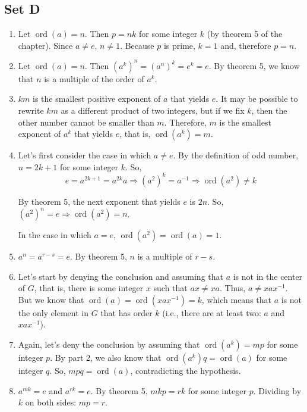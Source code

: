 \documentclass{article}
\DeclareMathOperator{\ord}{ord}
\begin{document}
\subsection{Set D}
\begin{enumerate}
    \item Let $ \ord(a) = n $. Then $ p = nk $ for some integer $ k $ (by theorem 5 of the chapter). Since $ a \ne e $, $ n \ne  1$. Because $ p $ is prime, $  k = 1 $ and, therefore $ p = n $.

    \item Let $ \ord(a) = n $. Then $ (a^k)^n = (a^n)^k = e^k = e $. By theorem 5, we know that $ n $ is a multiple of the order of $ a^k $.

    \item $ km $ is the smallest positive exponent of $ a $ that yields $ e $. It may be possible to rewrite $ km $ as a different product of two integers, but if we fix $ k $, then the other number cannot be smaller than $ m $. Therefore, $ m $ is the smallest exponent of $ a^k $ that yields $ e $, that is, $ \ord(a^k) = m $.

    \item Let's first consider the case in which $ a \ne e $. By the definition of odd number, $ n = 2k + 1 $ for some integer $ k $. So, 
    $$ e = a^{2k + 1} = a^{2k}a \Rightarrow (a^2)^k = a^{-1} \Rightarrow \ord(a^2) \ne k $$

    By theorem 5, the next exponent that yields $e$ is $ 2n $. So, $ (a^{2})^n = e \Rightarrow \ord(a^2) = n $.

    In the case in which $ a = e $, $ \ord(a^2) = \ord(a) = 1 $.

    \item $ a^n = a^{r - s} = e $. By theorem 5, $ n $ is a multiple of $ r - s $.

    \item Let's start by denying the conclusion and assuming that $ a $ is not in the center of $ G $, that is, there is some integer $ x $ such that $ ax \ne xa $. Thus, $ a \ne xax^{-1} $. But we know that $ \ord(a) = \ord(xax^{-1}) = k $, which means that $ a $ is not the only element in $ G $ that has order $ k $ (i.e., there are at least two: $ a $ and $ xax^{-1} $).

    \item Again, let's deny the conclusion by assuming that $ \ord(a^k) = mp $ for some integer $ p $. By part 2, we also know that $ \ord(a^k)q = \ord(a) $ for some integer $ q $. So, $ mpq = \ord(a) $, contradicting the hypothesis.

    \item $ a^{mk} = e $ and $ a^{rk} = e $. By theorem 5, $ mkp = rk $ for some integer $ p $. Dividing by $ k $ on both sides: $ mp = r $. 
\end{enumerate}
\end{document}

